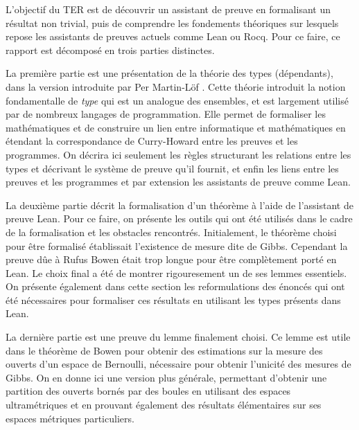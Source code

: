 \documentclass[../rapport.tex]{subfiles}
\begin{document}
  L'objectif du TER est de découvrir un assistant de preuve en formalisant un résultat non trivial,
  puis de comprendre les fondements théoriques sur lesquels repose les assistants de preuves actuels comme Lean ou Rocq.
  Pour ce faire, ce rapport est décomposé en trois parties distinctes.
  \vspace{0em}

  La première partie est une présentation de la théorie des types (dépendants),
  dans la version introduite par Per Martin-Löf \cite{martin2021intuitionistic}.
  Cette théorie introduit la notion fondamentalle de \textit{type} qui est un analogue des ensembles,
  et est largement utilisé par de nombreux langages de programmation.
  Elle permet de formaliser les mathématiques et de construire un lien entre informatique et mathématiques en étendant
  la correspondance de Curry-Howard entre les preuves et les programmes.
  On décrira ici seulement les règles structurant les relations entre les types et décrivant le système de preuve qu'il fournit,
  et enfin les liens entre les preuves et les programmes et par extension les assistants de preuve comme Lean.
  \vspace{1em}

  La deuxième partie décrit la formalisation d'un théorème à l'aide de l'assistant de preuve Lean.
  Pour ce faire, on présente les outils qui ont été utilisés dans le cadre de la formalisation et les obstacles rencontrés.
  Initialement, le théorème choisi pour être formalisé établissait l'existence de mesure dite de Gibbs.
  Cependant la preuve dûe à Rufus Bowen \cite{bowen} était trop longue pour être complètement porté en Lean.
  Le choix final a été de montrer rigouresement un de ses lemmes essentiels.
  On présente également dans cette section les reformulations des énoncés qui ont été nécessaires pour formaliser
  ces résultats en utilisant les types présents dans Lean.
  \vspace{1em}

  La dernière partie est une preuve du lemme finalement choisi.
  Ce lemme est utile dans le théorème de Bowen pour obtenir des estimations sur la mesure des ouverts d'un espace de Bernoulli,
  nécessaire pour obtenir l'unicité des mesures de Gibbs.
  On en donne ici une version plus générale,
  permettant d'obtenir une partition des ouverts bornés par des boules en utilisant des espaces ultramétriques
  et en prouvant également des résultats élémentaires sur ses espaces métriques particuliers.
\end{document}
